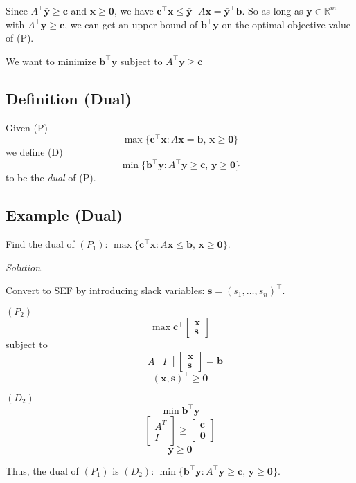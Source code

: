 Since $ A ^\top \bm{\bar{y}}\ge \bm{c} $ and $ \bm{x}\ge \bm{0} $,
we have $ \bm{c}^\top \bm{x}\le \bm{\bar{y}}^\top A \bm{x} =
\bm{\bar{y}}^\top \bm{b} $. So as long as $ \bm{y}\in\mathbb{R}^m $
with $ A ^\top \bm{y}\ge \bm{c} $, we can get an upper bound
of $ \bm{b} ^\top\bm{y} $ on the optimal objective value of (P).

We want to minimize $ \bm{b}^\top\bm{y} $ subject to $ A ^\top \bm{y}\ge \bm{c} $

\begin{defbox}
    \subsection{Definition (Dual)}
    Given (P)
    \[ \max \{\bm{c}^{\top} \bm{x}: A \bm{x}=\bm{b},\, \bm{x} \geq \bm{0}\} \]
    we define (D)
    \[ \min \{\bm{b}^{\top} \bm{y}: A^{\top} \bm{y} \geq \bm{c},\, \bm{y} \geq \bm{0}\}\]
    to be the \emph{dual} of (P).
\end{defbox}

\subsection{Example (Dual)}
Find the dual of
$ (P_1)$: $\max \{\bm{c}^\top \bm{x}: A \bm{x}\le \bm{b},\,\bm{x}\ge \bm{0}\}$.

\emph{Solution.}

Convert to SEF by introducing slack variables: $ \bm{s}=(s_1,\ldots,s_n)^\top $.

$ (P_2) $
\[ \max \bm{c}^\top
\begin{bmatrix}
    \bm{x}\\
    \bm{s}
\end{bmatrix} \]
subject to
\[ \left[ \begin{array}{c|c}
    A & I
\end{array} \right]
\begin{bmatrix}
    \bm{x}\\
    \bm{s}
\end{bmatrix} = \bm{b} \]
\[ (\bm{x},\bm{s})^\top\ge \bm{0} \]

$ (D_2) $
\[ \min \bm{b}^\top \bm{y} \]
\[ \begin{bmatrix}
    A^T\\
    I
\end{bmatrix} \ge
\begin{bmatrix}
    \bm{c}\\
    \bm{0}
\end{bmatrix}\]
\[ \bm{y}\ge \bm{0} \]

Thus, the dual of $ (P_1) $ is $ (D_2) $: 
$\min\{\bm{b}^\top \bm{y}: A ^\top \bm{y}\ge \bm{c},\,\bm{y}\ge \bm{0}\}$.